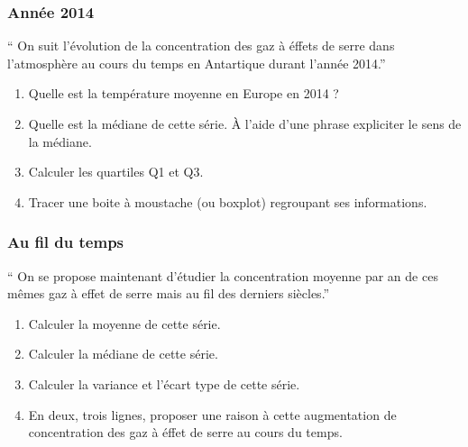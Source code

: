 \documentclass[12pt]{article}
\begin{document}
\begin{multicols}{2}

  \subsubsection*{Année 2014}

  `` On suit l'évolution de la concentration des gaz à éffets de serre dans l'atmosphère au cours du temps en Antartique durant l'année 2014.''\\

  \begin{enumerate}
  \item[1.] Quelle est la température moyenne en Europe en 2014 ? 
  \item[2.] Quelle est la médiane de cette série. À l'aide d'une phrase expliciter le sens de la médiane. 
  \item[3.] Calculer les quartiles Q1 et Q3.
  \item[4.] Tracer une boite à moustache (ou boxplot) regroupant ses informations. 
  \end{enumerate}

  \subsubsection*{Au fil du temps}

  `` On se propose maintenant d'étudier la concentration moyenne par an de ces mêmes gaz à effet de serre mais au fil des derniers siècles.''

  \begin{enumerate}
  \item[1.] Calculer la moyenne de cette série. 
  \item[2.] Calculer la médiane de cette série. 
  \item[3.] Calculer la variance et l'écart type de cette série.
  \item[4.] En deux, trois lignes, proposer une raison à cette augmentation de concentration des gaz à éffet de serre au cours du temps.
  \end{enumerate}

\end{multicols}
\end{document}

